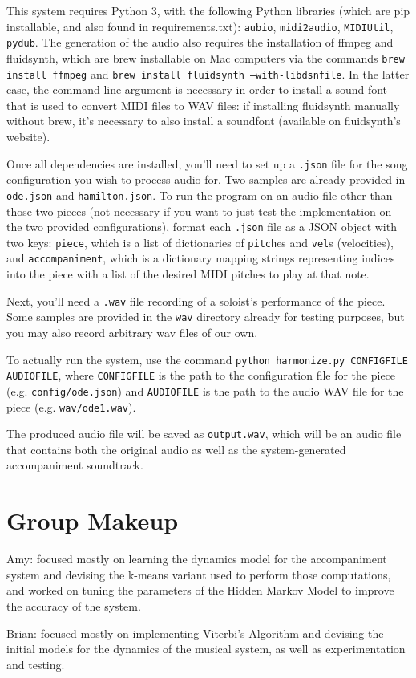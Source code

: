 \documentclass[11pt]{article}
\begin{document}
This system requires Python 3, with the following Python libraries (which are pip installable,
and also found in requirements.txt): \texttt{aubio}, \texttt{midi2audio}, \texttt{MIDIUtil},
\texttt{pydub}. The generation of the audio also requires
the installation of ffmpeg and fluidsynth,
which are brew installable on Mac computers via the commands \texttt{brew install ffmpeg}
and \texttt{brew install fluidsynth --with-libdsnfile}. In the latter case, the command line
argument is necessary in order to install a sound font that is used to convert MIDI files to
WAV files: if installing fluidsynth manually without brew, it's necessary to also install a
soundfont (available on fluidsynth's website).

Once all dependencies are installed, you'll need to set up a \texttt{.json} file
for the song configuration you wish to process audio for. Two samples are already provided in
\texttt{ode.json} and \texttt{hamilton.json}. To run the program on an audio file other
than those two pieces (not necessary if you want to just test the implementation
on the two provided configurations),
format each \texttt{.json} file as a JSON object with two keys:
\texttt{piece}, which is a list of dictionaries of \texttt{pitch}es and \texttt{vel}s
(velocities), and \texttt{accompaniment}, which is a dictionary mapping strings
representing indices into the piece with a list of the desired MIDI pitches to play
at that note.

Next, you'll need a \texttt{.wav} file recording of a soloist's performance of the piece.
Some samples are provided in the \texttt{wav} directory already for testing purposes,
but you may also record arbitrary wav files of our own.

To actually run the system, use the command
\texttt{python harmonize.py CONFIGFILE AUDIOFILE}, where
\texttt{CONFIGFILE} is the path to the configuration file for the piece
(e.g. \texttt{config/ode.json})
and \texttt{AUDIOFILE} is the path to the audio WAV file for the piece
(e.g. \texttt{wav/ode1.wav}).

The produced audio file will be saved as \texttt{output.wav}, which will
be an audio file that contains both the original audio as well as the system-generated
accompaniment soundtrack.

\section{Group Makeup}

Amy: focused mostly on learning the dynamics model for the accompaniment
system and devising the k-means variant used to perform those computations,
and worked on tuning the parameters of the Hidden Markov Model to improve
the accuracy of the system.

Brian: focused mostly on implementing Viterbi's Algorithm and devising
the initial models for the dynamics of the musical system, as well as
experimentation and testing.



\end{document}
